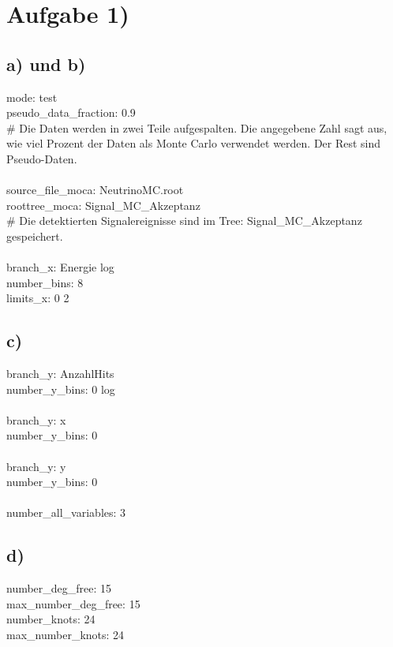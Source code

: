 \section*{Aufgabe 1)}
\subsection*{a) und b)}
mode: test \\
pseudo\_data\_fraction: 0.9 \\
\# Die Daten werden in zwei Teile aufgespalten. Die angegebene Zahl sagt aus, wie viel Prozent der Daten als Monte Carlo verwendet werden. Der Rest sind Pseudo-Daten. \\
\\
source\_file\_moca: NeutrinoMC.root \\
roottree\_moca: Signal\_MC\_Akzeptanz \\
\# Die detektierten Signalereignisse sind im Tree: Signal\_MC\_Akzeptanz gespeichert. \\
\\
branch\_x: Energie log \\
number\_bins: 8 \\
limits\_x: 0 2 \\



\subsection*{c)}
branch\_y: AnzahlHits \\
number\_y\_bins: 0 log \\
\\
branch\_y: x \\
number\_y\_bins: 0 \\
\\
branch\_y: y \\
number\_y\_bins: 0 \\
\\
number\_all\_variables: 3 \\



\subsection*{d)}
number\_deg\_free: 15 \\
max\_number\_deg\_free: 15 \\
number\_knots: 24 \\
max\_number\_knots: 24 \\

